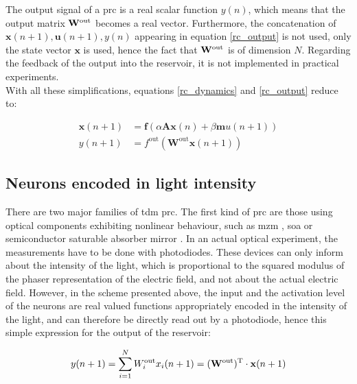 The output signal of a \gls{prc} is a real scalar function $y(n)$, which means that the output matrix $\mathbf{W}^{\text{out}}$ becomes a real vector. Furthermore, the concatenation of $\mathbf{x}(n+1), \mathbf{u}(n+1), y(n)$ appearing in equation \eqref{rc_output} is not used, only the state vector $\mathbf{x}$ is used, hence the fact that $\mathbf{W}^{\text{out}}$ is of dimension $N$. Regarding the feedback of the output into the reservoir, it is not implemented in practical \rcer experiments.\\

With all these simplifications, equations \eqref{rc_dynamics} and \eqref{rc_output} reduce to:

\begin{align}
	\mathbf{x}(n+1) &= \mathbf{f} \left( \alpha \mathbf{A} \mathbf{x}(n) + \beta \mathbf{m} u(n+1) \right)\\
	y(n+1) &= f^{\text{out}} \left( \mathbf{W}^{\text{out}} \mathbf{x}(n+1) \right)
\end{align}


\subsection{Neurons encoded in light intensity}

There are two major families of \gls{tdm} \gls{prc}. The first kind of \gls{prc} are those using optical components exhibiting nonlinear behaviour, such as \gls{mzm} \cite{Duport2016, Paquot2012, Antonik2017}, \gls{soa} \cite{Vandoorne2008} or semiconductor saturable absorber mirror \cite{Dejonckheere2014}. In an actual optical experiment, the measurements have to be done with photodiodes. These devices can only inform about the intensity of the light, which is proportional to the squared modulus of the phaser representation of the electric field, and not about the actual electric field. However, in the scheme presented above, the input and the activation level of the neurons are real valued functions appropriately encoded in the intensity of the light, and can therefore be directly read out by a photodiode, hence this simple expression for the output of the reservoir:

\begin{equation}
	y(n+1) = \sum_{i=1}^{N} W^{\text{out}}_i x_i (n+1) = (\mathbf{W}^{\text{out}})^{\text{T}} \cdot \mathbf{x}(n+1)
	\label{lin_output_rc}
\end{equation}


